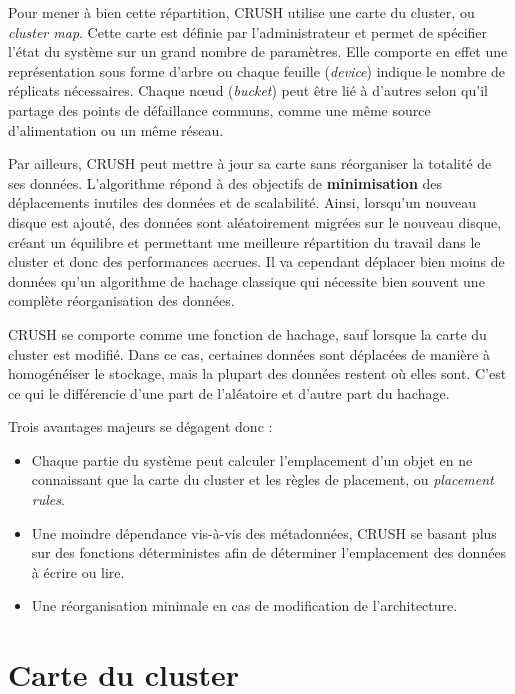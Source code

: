 Pour mener à bien cette répartition, CRUSH utilise une carte du cluster, ou \textit{cluster map}. Cette carte est définie par l'administrateur et permet de spécifier l'état du système sur un grand nombre de paramètres. Elle comporte en effet une représentation sous forme d'arbre ou chaque feuille (\textit{device}) indique le nombre de réplicats nécessaires. Chaque nœud (\textit{bucket}) peut être lié à d'autres selon qu'il partage des points de défaillance communs, comme une même source d'alimentation ou un même réseau.

Par ailleurs, CRUSH peut mettre à jour sa carte sans réorganiser la totalité de ses données. L'algorithme répond à des objectifs de \textbf{minimisation} des déplacements inutiles des données et de scalabilité. Ainsi, lorsqu'un nouveau disque est ajouté, des données sont aléatoirement migrées sur le nouveau disque, créant un équilibre et permettant une meilleure répartition du travail dans le cluster et donc des performances accrues. Il va cependant déplacer bien moins de données qu'un algorithme de hachage classique qui nécessite bien souvent une complète réorganisation des données. 

\begin{PimpedBox}
CRUSH se comporte comme une fonction de hachage, sauf lorsque la carte du cluster est modifié. Dans ce cas, certaines données sont déplacées de manière à homogénéiser le stockage, mais la plupart des données restent où elles sont. C'est ce qui le différencie d'une part de l'aléatoire et d'autre part du hachage.
\end{PimpedBox}

\newpage
Trois avantages majeurs se dégagent donc :

\begin{itemize}
\item Chaque partie du système peut calculer l'emplacement d'un objet en ne connaissant que la carte du cluster et les règles de placement, ou \textit{placement rules}.
\item Une moindre dépendance vis-à-vis des métadonnées, CRUSH se basant plus sur des fonctions déterministes afin de déterminer l'emplacement des données à écrire ou lire.
\item Une réorganisation minimale en cas de modification de l'architecture.
\end{itemize}

\section{Carte du cluster}

